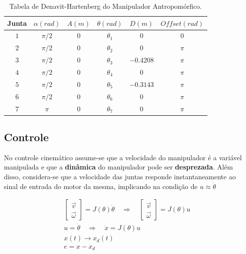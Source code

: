 \documentclass[a4paper,11pt]{article}
\theoremstyle{mytheor}
\begin{document}
\begin{table}[!ht]
\centering
\caption{Tabela de Denavit-Hartenberg do Manipulador Antropomórfico.}
\label{tab:ex1_dh}

\begin{tabular}{|c|c|c|c|c|c|}
\hline
Junta  & $\alpha (rad)$ & $A (m)$ & $\theta (rad)$ & $D (m)$ & $Offset (rad)$ \\ \hline
$1$  & $\pi/2$ & 0 & $\theta_1$ & 0 & 0 \\ \hline
$2$  & $\pi/2$ & 0 & $\theta_2$ & 0 & $\pi$ \\ \hline
$3$  & $\pi/2$ & 0 & $\theta_3$ & $-0.4208$ & $\pi$ \\ \hline
$4$  & $\pi/2$ & 0 & $\theta_4$ & 0 & $\pi$ \\ \hline
$5$  & $\pi/2$ & 0 & $\theta_5$ & $-0.3143$ & $\pi$ \\ \hline
$6$  & $\pi/2$ & 0 & $\theta_6$ & 0 & $\pi$ \\ \hline
$7$  & $\pi$   & 0 & $\theta_7$ & 0 & $\pi$ \\ \hline

\end{tabular}
\end{table}

\subsection{Controle}


No controle cinemático assume-se que a velocidade do manipulador é a variável manipulada e que a \textbf{dinâmica} do manipulador pode ser \textbf{desprezada}. Além disso, considera-se que a velocidade das juntas responde instantaneamente ao sinal de entrada do motor da mesma, implicando na condição de $ u \approx \dot{\theta} $

\begin{gather*}
\begin{bmatrix} \vec{v} \\ \vec{\omega} \end{bmatrix} = J(\theta)\dot{\theta} \quad \Rightarrow \quad  \begin{bmatrix} \vec{v} \\ \vec{\omega} \end{bmatrix} = J(\theta)u\\
u = \dot{\theta} \quad \Rightarrow \quad \dot{x} = J(\theta)u \\
x(t) \longrightarrow x_d(t) \\
e = x - x_d \\
\end{gather*}
\end{document}
